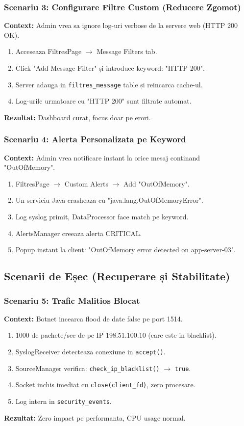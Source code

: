 \documentclass[runningheads]{llncs}
\begin{document}
\subsubsection{Scenariu 3: Configurare Filtre Custom (Reducere Zgomot)}
\textbf{Context:} Admin vrea sa ignore log-uri verbose de la servere web (HTTP 200 OK).
\begin{enumerate}
    \item Acceseaza FiltresPage $\rightarrow$ Message Filters tab.
    \item Click "Add Message Filter" și introduce keyword: "HTTP 200".
    \item Server adauga in \texttt{filtres\_message} table și reincarca cache-ul.
    \item Log-urile urmatoare cu "HTTP 200" sunt filtrate automat.
\end{enumerate}
\textbf{Rezultat:} Dashboard curat, focus doar pe erori.

\subsubsection{Scenariu 4: Alerta Personalizata pe Keyword}
\textbf{Context:} Admin vrea notificare instant la orice mesaj continand "OutOfMemory".
\begin{enumerate}
    \item FiltresPage $\rightarrow$ Custom Alerts $\rightarrow$ Add "OutOfMemory".
    \item Un serviciu Java crasheaza cu "java.lang.OutOfMemoryError".
    \item Log syslog primit, DataProcessor face match pe keyword.
    \item AlertsManager creeaza alerta CRITICAL.
    \item Popup instant la client: "OutOfMemory error detected on app-server-03".
\end{enumerate}

\subsection{Scenarii de Eșec (Recuperare și Stabilitate)}

\subsubsection{Scenariu 5: Trafic Malitios Blocat}
\textbf{Context:} Botnet incearca flood de date false pe port 1514.
\begin{enumerate}
    \item 1000 de pachete/sec de pe IP 198.51.100.10 (care este in blacklist).
    \item SyslogReceiver detecteaza conexiune in \texttt{accept()}.
    \item SourceManager verifica: \texttt{check\_ip\_blacklist()} $\rightarrow$ \texttt{true}.
    \item Socket inchis imediat cu \texttt{close(client\_fd)}, zero procesare.
    \item Log intern in \texttt{security\_events}.
\end{enumerate}
\textbf{Rezultat:} Zero impact pe performanta, CPU usage normal.
\end{document}
